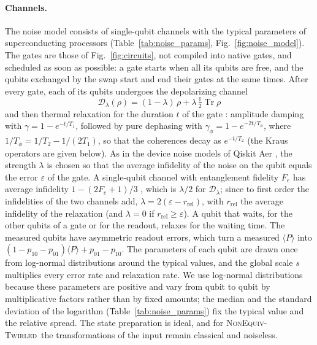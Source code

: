 \documentclass[aps,pra,reprint,superscriptaddress,longbibliography]{revtex4-2}
\newcommand{\Twirled}{\textsc{NonEquiv-Twirled}}
\newcommand{\tr}{\operatorname{Tr}}
\begin{document}
\paragraph{Channels.} The noise model consists of single-qubit channels with the typical parameters of superconducting processors (Table~\ref{tab:noise_params}, Fig.~\ref{fig:noise_model}). The gates are those of Fig.~\ref{fig:circuits}, not compiled into native gates, and scheduled as soon as possible: a gate starts when all its qubits are free, and the qubits exchanged by the swap start and end their gates at the same times.
After every gate, each of its qubits undergoes the depolarizing channel
\begin{equation}
\mathcal D_\lambda(\rho)=(1-\lambda)\,\rho+\lambda\,\tfrac{\mathbb I}{2}\tr\rho
\end{equation}
and then thermal relaxation for the duration $t$ of the gate \citep{nielsen2010quantum}: amplitude damping with $\gamma=1-e^{-t/T_1}$, followed by pure dephasing with $\gamma_\phi=1-e^{-2t/T_\phi}$, where $1/T_\phi=1/T_2-1/(2T_1)$, so that the coherences decay as $e^{-t/T_2}$ (the Kraus operators are given below). As in the device noise models of Qiskit Aer \citep{javadiabhari2024qiskit}, the strength $\lambda$ is chosen so that the average infidelity of the noise on the qubit equals the error $\varepsilon$ of the gate. A single-qubit channel with entanglement fidelity $F_e$ has average infidelity $1-(2F_e+1)/3$ \citep{nielsen2002simple}, which is $\lambda/2$ for $\mathcal D_\lambda$; since to first order the infidelities of the two channels add, $\lambda=2(\varepsilon-r_{\mathrm{rel}})$, with $r_{\mathrm{rel}}$ the average infidelity of the relaxation (and $\lambda=0$ if $r_{\mathrm{rel}}\ge\varepsilon$). A qubit that waits, for the other qubits of a gate or for the readout, relaxes for the waiting time. The measured qubits have asymmetric readout errors, which turn a measured $\langle P\rangle$ into $(1-p_{10}-p_{01})\langle P\rangle+p_{01}-p_{10}$. The parameters of each qubit are drawn once from log-normal distributions around the typical values, and the global scale $s$ multiplies every error rate and relaxation rate. We use log-normal distributions because these parameters are positive and vary from qubit to qubit by multiplicative factors rather than by fixed amounts; the median and the standard deviation of the logarithm (Table~\ref{tab:noise_params}) fix the typical value and the relative spread. The state preparation is ideal, and for \Twirled\ the transformations of the input remain classical and noiseless.
\end{document}
